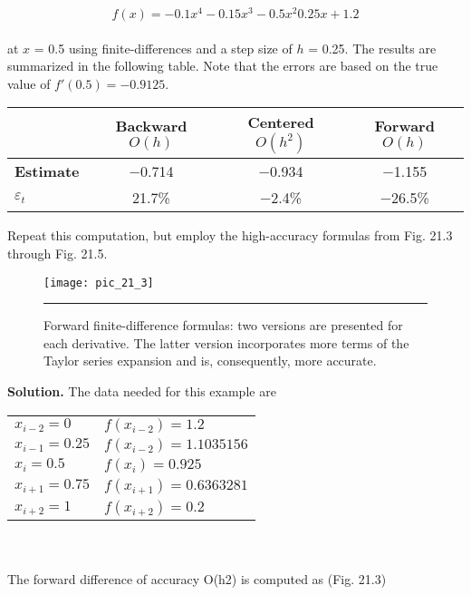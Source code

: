 \documentclass[../main.tex]{subfiles}
\begin{document}
	$$f(x) = -0.1x^{4} - 0.15x^{3} - 0.5x^{2} 0.25x +1.2$$\\
at $x$ = 0.5 using finite-differences and a step size of $h$ = 0.25. The results are summarized
in the following table. Note that the errors are based on the true value of
$f' (0.5) = −0.9125$.

\begin{table}[hbt!]
\centering
\begin{tabular}{lccc}
\hline
	\vspace{0,1in} & \textbf{Backward $O(h)$} & \textbf{Centered $O(h^{2})$} & \textbf{Forward $O(h)$}\\ \hline
	
	\textbf{Estimate} & −0.714 & −0.934 & −1.155\\
	
	$\varepsilon_{t}$ & 21.7\% & −2.4\% & −26.5\%\\ \hline
\end{tabular}
\end{table}
Repeat this computation, but employ the high-accuracy formulas from Fig. 21.3 through
Fig. 21.5.

\begin{figure}[hbt!]
	\centering
	\texttt{[image: pic\_21\_3]}
	\caption{\textsf{Forward finite-difference formulas: two versions are presented for each derivative. The latter version
incorporates more terms of the Taylor series expansion and is, consequently, more accurate.}} \hrule
	\label{pic.21.3}
\end{figure}
\vspace{0.2in}
\textbf{Solution.} The data needed for this example are

\begin{tabular}{ll}
	
	$x_{i-2} = 0$ & $f(x_{i-2}) = 1.2$\\
	
	$x_{i-1} = 0.25$ & $f(x_{i-2}) = 1.1035156$\\
	
	$x_{i} = 0.5$ & $f(x_{i}) = 0.925$\\
	
	$x_{i+1} = 0.75$ & $f(x_{i+1}) = 0.6363281$\\
	
	$x_{i+2} = 1$ & $f(x_{i+2}) = 0.2$
\end{tabular}\\
\vspace{0.2in}\\
The forward difference of accuracy O(h2) is computed as (Fig. 21.3)
\end{document}

